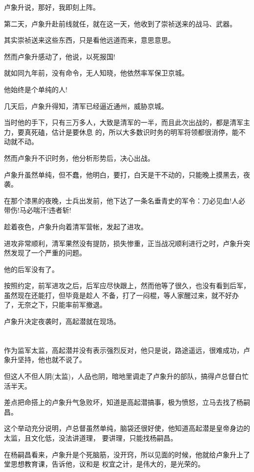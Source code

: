 \documentclass[11pt,a4paper,onecolumn]{article}
\begin{document}
卢象升说，那好，我即刻上阵。

第二天，卢象升赴前线就任，就在这一天，他收到了崇祯送来的战马、武器。

其实崇祯送来这些东西，只是看他远道而来，意思意思。

然而卢象升感动了，他说，以死报国!

就如同九年前，没有命令，无人知晓，他依然率军保卫京城。

他始终是个单纯的人!

几天后，卢象升得知，清军已经逼近通州，威胁京城。

当时他的手下，只有三万多人，大致是清军的一半，而且此次出战的，都是清军主力，要真死磕，估计是要休息
的，所以大多数识时务的明军将领都很消停，能不动就不动。

然而卢象升不识时务，他分析形势后，决心出战。

卢象升虽然单纯，但不蠢，他明白，要打，白天是干不动的，只能晚上摸黑去，夜袭。

在那个漆黑的夜晚，士兵出发前，他下达了一条名垂青史的军令：刀必见血!人必带伤!马必喘汗!违者斩!

趁着夜色，卢象升向着清军营帐，发起了进攻。

进攻非常顺利，清军果然没有提防，损失惨重，正当战况顺利进行之时，卢象升突然发现了一个严重的问题。

他的后军没有了。

按照约定，前军进攻之后，后军应尽快跟上，然而他等了很久，也没有看到后军，虽然现在还能打，但毕竟是趁人
不备，打了一闷棍，等人家醒过来，就不好办了，无奈之下，只能率前军撤退。

卢象升决定夜袭时，高起潜就在现场。

\section[\thesection]{}

作为监军太监，高起潜并没有表示强烈反对，他只是说，路途遥远，很难成功，卢象升坚持，他也就不说了。

但这人不但人阴(太监)，人品也阴，暗地里调走了卢象升的部队，搞得卢总督白忙活半天。

差点把命搭上的卢象升气急败坏，知道是高起潜搞事，极为愤怒，立马去找了杨嗣昌。

这个举动充分说明，卢总督虽然单纯，脑袋还很好使，他知道高起潜是皇帝身边的太监，且文化低，没法讲道理，
要讲理，只能找杨嗣昌。

在杨嗣昌看来，卢象升是个死脑筋，没开窍，所以见面的时候，他就给卢象升上了堂思想教育课，告诉他，议和是
权宜之计，是伟大的，是光荣的。
\end{document}

